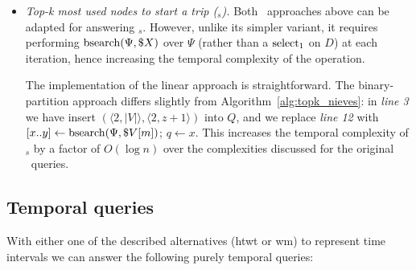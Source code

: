 \begin{itemize}
\begin{algorithm}[ht]
     
	\caption{Algorithm {\em Top-k most used nodes} using binary-partition approach.}
	\label{alg:topk_nieves}
	\end{algorithm}

	\item {\em Top-k most used nodes to start a trip (\topK$_s$).}
	Both \topK\ approaches above can be adapted for answering \topK$_s$.
	However, unlike its simpler variant, it requires performing $\operatorname{bsearch}(\Psi,\$X)$ over $\Psi$ (rather than a $\operatorname{select}_1$ on $D$) at
	each iteration, hence increasing the temporal complexity of the operation.

	The implementation of the linear approach is straightforward. The binary-partition approach differs slightly 
	from Algorithm~\ref{alg:topk_nieves}: in \textit{line 3} we have insert $(\langle 2, |V| \rangle, \langle 2,z+1 \rangle)$ into $Q$, and we 
	replace \textit{line 12} with $[x..y]\leftarrow\operatorname{bsearch}(\Psi,\$V[m])$; $q \leftarrow x$. This increases the temporal complexity of \topK$_s$ by a factor of $O(\log n)$ over the complexities discussed for the original \topK\ queries.
	\end{itemize}

	\subsection{Temporal queries}
	\label{sec:ctr:alg:tq}
	With either one of the described alternatives (\gls{htwt} or \gls{wm}) to represent time intervals we can answer the following purely temporal queries:
	
